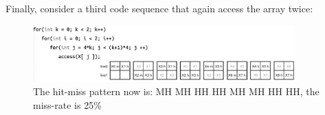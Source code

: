 Finally, consider a third code sequence that again access the array twice:
\begin{figure}[H]
    \centering
    \includegraphics[width=0.9\textwidth]{assets/opt12.png}
    \caption{The hit-miss pattern now is: MH MH HH HH MH MH HH HH, the miss-rate is 25\%}
\end{figure}

